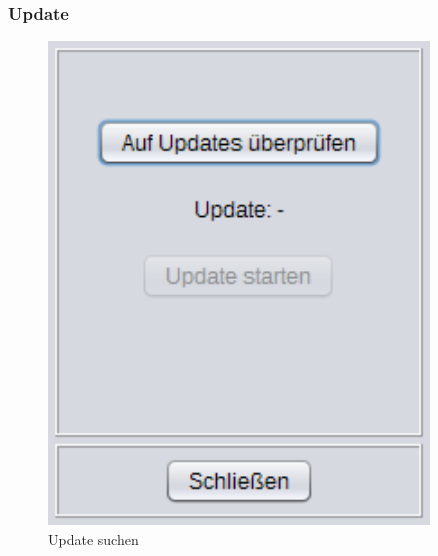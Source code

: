 \subsubsection{Update}\label{subsubsec:Update}
\begin{figure}[H]
  \begin{minipage}[hbt]{0.45\textwidth}
    \includegraphics[width=0.9\textwidth]{Bilder/GUI/Update1}
 	\caption{Update suchen}
  	\label{Update}
  \end{minipage}
\hspace{.03\linewidth}
  \begin{minipage}[hbt]{0.45\textwidth}

\end{minipage}
\end{figure}
